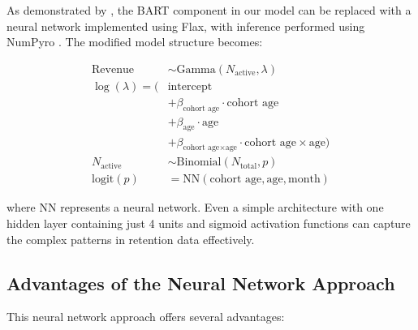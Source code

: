\documentclass[11pt]{amsart}
\theoremstyle{definition}
\begin{document}
As demonstrated by \cite{orduz_revenue_retention_numpyro}, the BART component in our model can be replaced with a neural
network implemented using Flax, with inference performed using NumPyro \cite{phan2019composable}. The modified model
structure becomes:

\begin{align*}
    \text{Revenue}    & \sim \text{Gamma}(N_{\text{active}}, \lambda)                                            \\
    \log(\lambda) = ( & \text{intercept}                                                                         \\
                      & + \beta_{\text{cohort age}} \cdot \text{cohort age}                                      \\
                      & + \beta_{\text{age}} \cdot \text{age}                                                    \\
                      & + \beta_{\text{cohort age} \times \text{age}} \cdot \text{cohort age} \times \text{age}) \\
    N_{\text{active}} & \sim \text{Binomial}(N_{\text{total}}, p)                                                \\
    \textrm{logit}(p) & = \text{NN}(\text{cohort age}, \text{age}, \text{month})
\end{align*}

where $\text{NN}$ represents a neural network. Even a simple architecture with one hidden layer containing just 4 units and
sigmoid activation functions can capture the complex patterns in retention data effectively.

\subsection{Advantages of the Neural Network Approach}

This neural network approach offers several advantages:
\end{document}
